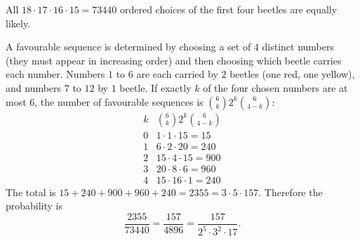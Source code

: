 All $18\cdot17\cdot16\cdot15=73440$ ordered choices of the first four beetles are equally likely.

A favourable sequence is determined by choosing a set of $4$ distinct numbers (they must appear in increasing order) and then choosing which beetle carries each number. Numbers $1$ to $6$ are each carried by $2$ beetles (one red, one yellow), and numbers $7$ to $12$ by $1$ beetle. If exactly $k$ of the four chosen numbers are at most $6$, the number of favourable sequences is $\binom{6}{k}2^k\binom{6}{4-k}$:
\[
\begin{array}{c|c}
k & \binom6k 2^k\binom6{4-k}\\\hline
0 & 1\cdot1\cdot15=15\\
1 & 6\cdot2\cdot20=240\\
2 & 15\cdot4\cdot15=900\\
3 & 20\cdot8\cdot6=960\\
4 & 15\cdot16\cdot1=240
\end{array}
\]
The total is $15+240+900+960+240=2355=3\cdot5\cdot157$. Therefore the probability is
\[
\dfrac{2355}{73440}=\boxed{\dfrac{157}{4896}}=\dfrac{157}{2^5\cdot3^2\cdot17}.
\]
